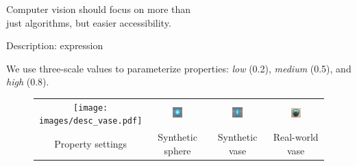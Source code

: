 \documentclass[10pt]{beamer}
\begin{document}
\begin{frame}[standout]

Computer vision should focus on more than \\just algorithms, but easier accessibility.

\end{frame}

\appendix
\begin{frame}{Description: expression}

We use three-scale values to parameterize properties: \textit{low} (0.2), \textit{medium} (0.5), and \textit{high} (0.8).

\begin{figure}[!htbp]
\centering
\begin{tabular}{cccc}
  \texttt{[image: images/desc\_vase.pdf]}&
  \includegraphics[width=0.2\textwidth]{interp/ui/ui_sphere.png}&
  \includegraphics[width=0.2\textwidth]{interp/ui/ui_vase.png}&
  \includegraphics[width=0.2\textwidth]{interp/real_world_img/vase/vase.jpg}\\
  Property settings & Synthetic sphere & Synthetic vase & Real-world vase\\
\end{tabular}
\end{figure}

\end{frame}
\end{document}

